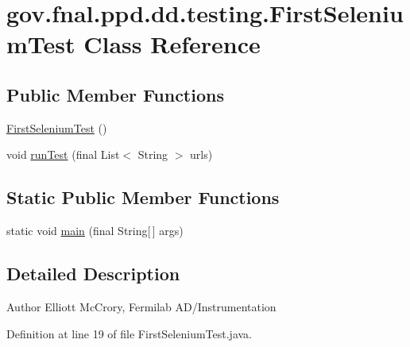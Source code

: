 \hypertarget{classgov_1_1fnal_1_1ppd_1_1dd_1_1testing_1_1FirstSeleniumTest}{\section{gov.\-fnal.\-ppd.\-dd.\-testing.\-First\-Selenium\-Test Class Reference}
\label{classgov_1_1fnal_1_1ppd_1_1dd_1_1testing_1_1FirstSeleniumTest}
}
\subsection*{Public Member Functions}
\begin{DoxyCompactItemize}
\item 
\hyperlink{classgov_1_1fnal_1_1ppd_1_1dd_1_1testing_1_1FirstSeleniumTest_a0db11ced86149bf3e4f2afb0e42665c2}{First\-Selenium\-Test} ()
\item 
void \hyperlink{classgov_1_1fnal_1_1ppd_1_1dd_1_1testing_1_1FirstSeleniumTest_aa563e9301b63fb25d4ca1e997e5f00c6}{run\-Test} (final List$<$ String $>$ urls)
\end{DoxyCompactItemize}
\subsection*{Static Public Member Functions}
\begin{DoxyCompactItemize}
\item 
static void \hyperlink{classgov_1_1fnal_1_1ppd_1_1dd_1_1testing_1_1FirstSeleniumTest_af5f159fe30f1bcffc4fa8e7536a095b9}{main} (final String\mbox{[}$\,$\mbox{]} args)
\end{DoxyCompactItemize}


\subsection{Detailed Description}
\begin{DoxyAuthor}{Author}
Elliott Mc\-Crory, Fermilab A\-D/\-Instrumentation 
\end{DoxyAuthor}


Definition at line 19 of file First\-Selenium\-Test.\-java.



